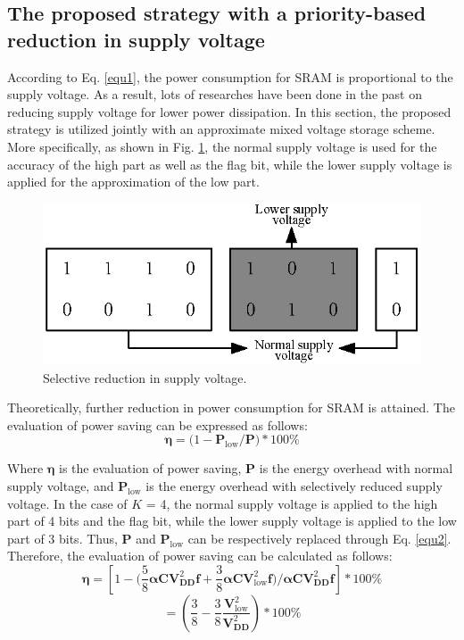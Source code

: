\documentclass[lettersize,journal]{IEEEtran}
\begin{document}
\subsection{The proposed strategy with a priority-based reduction in supply voltage}
According to Eq. \eqref{equ1}, the power consumption for SRAM is proportional to the supply voltage. As a result, lots of researches have been done in the past on reducing supply voltage for lower power dissipation. In this section, the proposed strategy is utilized jointly with an approximate mixed voltage storage scheme. More specifically, as shown in Fig. \ref{fig11}, the normal supply voltage is used for the accuracy of the high part as well as the flag bit, while the lower supply voltage is applied for the approximation of the low part. 
\begin{figure}[htb]
\centering
\includegraphics[width=\linewidth]{Fig/Selective reduction in supply voltage.png}
\caption{Selective reduction in supply voltage.}
\label{fig11}
\end{figure}

Theoretically, further reduction in power consumption for SRAM is attained. The evaluation of power saving can be expressed as follows:  
\begin{equation}
\label{equ2}
\boldsymbol{\eta }=\text{(}1-\boldsymbol{P}{{_{\mathrm{low}}}/{\boldsymbol{P}}}\text{)}*100\%
\end{equation}

Where $\boldsymbol{\eta}$ is the evaluation of power saving, $\boldsymbol{P}$ is the energy overhead with normal supply voltage, and $\boldsymbol{P_{\mathrm{low}}}$ is the energy overhead with selectively reduced supply voltage. In the case of $K$ = 4, the normal supply voltage is applied to the high part of 4 bits and the flag bit, while the lower supply voltage is applied to the low part of 3 bits. Thus, $\boldsymbol{P}$ and $\boldsymbol{P_{\mathrm{low}}}$ can be respectively replaced through Eq. \eqref{equ2}. Therefore, the evaluation of power saving can be calculated as follows:
$$
\boldsymbol{\eta }=[1-(\frac{5}{8}\boldsymbol{\alpha CV}_{\boldsymbol{DD}}^{2}\boldsymbol{f}+\frac{3}{8}\boldsymbol{\alpha CV}_{\mathrm{low}}^{2}\boldsymbol{f}{)/{\boldsymbol{\alpha }}}\boldsymbol{CV}_{\boldsymbol{DD}}^{2}\boldsymbol{f}]*100\% 
$$
\begin{equation}
\label{equ3} 
=(\frac{3}{8}-\frac{3}{8}\frac{\boldsymbol{V}_{\mathrm{low}}^{2}}{\boldsymbol{V}_{\boldsymbol{DD}}^{2}})*100\%
\end{equation}
\end{document}
